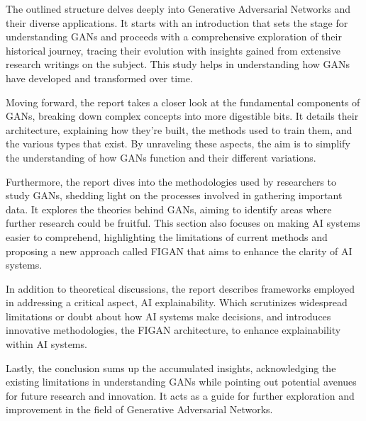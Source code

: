 \noindent
The outlined structure delves deeply into Generative Adversarial Networks and their diverse applications. It starts with an introduction that sets the stage for understanding GANs and proceeds with a comprehensive exploration of their historical journey, tracing their evolution with insights gained from extensive research writings on the subject. This study helps in understanding how GANs have developed and transformed over time.

\noindent
Moving forward, the report takes a closer look at the fundamental components of GANs, breaking down complex concepts into more digestible bits. It details their architecture, explaining how they're built, the methods used to train them, and the various types that exist. By unraveling these aspects, the aim is to simplify the understanding of how GANs function and their different variations.

\noindent
Furthermore, the report dives into the methodologies used by researchers to study GANs, shedding light on the processes involved in gathering important data. It explores the theories behind GANs, aiming to identify areas where further research could be fruitful. This section also focuses on making AI systems easier to comprehend, highlighting the limitations of current methods and proposing a new approach called FIGAN that aims to enhance the clarity of AI systems.

\noindent
In addition to theoretical discussions, the report describes frameworks employed in addressing a critical aspect, AI explainability. Which scrutinizes widespread limitations or doubt about how AI systems make decisions, and introduces innovative methodologies, the FIGAN architecture, to enhance explainability within AI systems.

\noindent
Lastly, the conclusion sums up the accumulated insights, acknowledging the existing limitations in understanding GANs while pointing out potential avenues for future research and innovation. It acts as a guide for further exploration and improvement in the field of Generative Adversarial Networks.